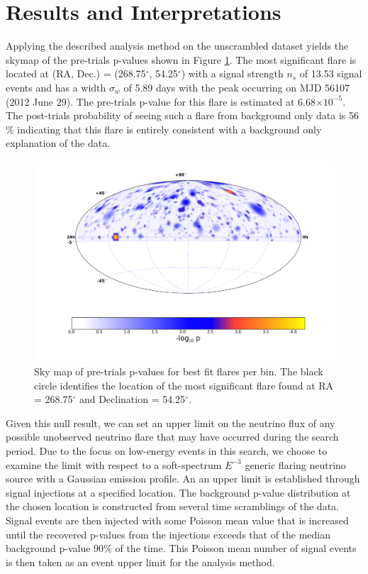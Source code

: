 \documentclass[manuscript]{aastex}
\begin{document}
\section{Results and Interpretations}
Applying the described analysis method on the unscrambled dataset yields the skymap of the pre-trials p-values shown in Figure \ref{fig:RealSkyMap}. The most significant flare is located at (RA, Dec.) = (268.75$^{\circ}$, 54.25$^{\circ}$) with a signal strength $n_s$ of 13.53 signal events and has a width $\sigma_w$ of 5.89 days with the peak occurring on MJD 56107 (2012 June 29). The pre-trials p-value for this flare is estimated at 6.68$\times 10^{-5}$. The post-trials probability of seeing such a flare from background only data is 56$\%$ indicating that this flare is entirely consistent with a background only explanation of the data.
\begin{figure}[ht]
  \begin{center}
    \includegraphics[width=1.0\textwidth,keepaspectratio]{plots/RealResultSkyMap.png}
  \end{center}
  \caption[Results Sky Map]{Sky map of pre-trials p-values for best fit flares per bin. The black circle identifies the location of the most significant flare found at RA = 268.75$^\circ$ and Declination = 54.25$^\circ$.}
  \label{fig:RealSkyMap}
\end{figure}
Given this null result, we can set an upper limit on the neutrino flux of any possible unobserved neutrino flare that may have occurred during the search period. Due to the focus on low-energy events in this search, we choose to examine the limit with respect to a soft-spectrum $E^{-3}$ generic flaring neutrino source with a Gaussian emission profile. An an upper limit is established through signal injections at a specified location. The background p-value distribution at the chosen location is constructed from several time scramblings of the data. Signal events are then injected with some Poisson mean value that is increased until the recovered p-values from the injections exceeds that of the median background p-value 90$\%$ of the time. This Poisson mean number of signal events is then taken as an event upper limit for the analysis method.
\end{document}
